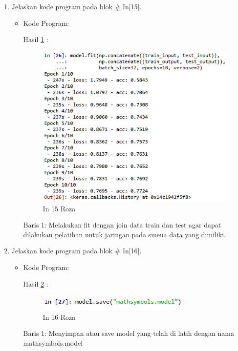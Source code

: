 \begin{enumerate}
\item Jelaskan kode program pada blok \# In[15].
\begin{itemize}
\item Kode Program:

\par Hasil \ref{in15roza} :
\begin{figure}[!hbtp]
\centering
\includegraphics[scale=0.7]{figures/prak15roza.png}
\caption{In 15 Roza}
\label{in15roza}
\end{figure}
\par Baris 1: Melakukan fit dengan join data train dan test agar dapat dilakukan pelatihan untuk jaringan pada smeua data yang dimiliki.
\end{itemize}
\par

\item Jelaskan kode program pada blok \# In[16].
\begin{itemize}
\item Kode Program:

\par Hasil \ref{in16roza} :
\begin{figure}[!hbtp]
\centering
\includegraphics[scale=0.7]{figures/prak16roza.png}
\caption{In 16 Roza}
\label{in16roza}
\end{figure}
\par Baris 1: Menyimpan atau save model yang telah di latih dengan nama mathsymbols.model 
\end{itemize}
\par


\end{enumerate}
